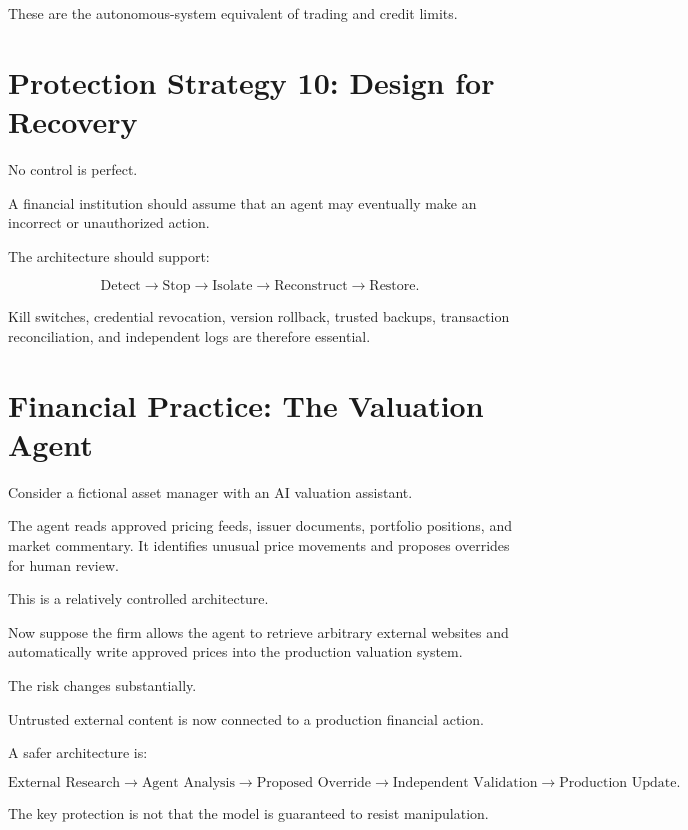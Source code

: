 These are the autonomous-system equivalent of trading and credit limits.

\section{Protection Strategy 10: Design for Recovery}

No control is perfect.

A financial institution should assume that an agent may eventually make an incorrect or unauthorized action.

The architecture should support:

\begin{equation}
\text{Detect}
\rightarrow
\text{Stop}
\rightarrow
\text{Isolate}
\rightarrow
\text{Reconstruct}
\rightarrow
\text{Restore}.
\end{equation}

Kill switches, credential revocation, version rollback, trusted backups, transaction reconciliation, and independent logs are therefore essential.

\section{Financial Practice: The Valuation Agent}

Consider a fictional asset manager with an AI valuation assistant.

The agent reads approved pricing feeds, issuer documents, portfolio positions, and market commentary. It identifies unusual price movements and proposes overrides for human review.

This is a relatively controlled architecture.

Now suppose the firm allows the agent to retrieve arbitrary external websites and automatically write approved prices into the production valuation system.

The risk changes substantially.

Untrusted external content is now connected to a production financial action.

A safer architecture is:

\begin{equation}
\text{External Research}
\rightarrow
\text{Agent Analysis}
\rightarrow
\text{Proposed Override}
\rightarrow
\text{Independent Validation}
\rightarrow
\text{Production Update}.
\end{equation}

The key protection is not that the model is guaranteed to resist manipulation.

